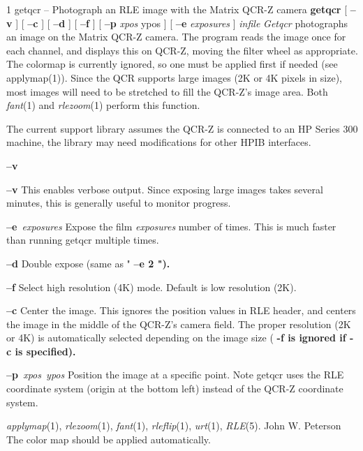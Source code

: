 %
%
%
 1
getqcr -- Photograph an RLE image with the Matrix QCR-Z camera
{\bf getqcr}
[
{\bf --v}
] [
{\bf --c}
] [
{\bf --d}
] [
{\bf --f}
] [
{\bf --p}
{\it xpos} ypos
] [
{\bf --e}
{\it exposures}
]
{\it infile}
{\it Getqcr}
photographs an image on the Matrix QCR-Z camera.  The program
reads the image once for each channel, and displays this on QCR-Z,
moving the filter wheel as appropriate.  The colormap is currently
ignored, so one must be applied first if needed (see applymap(1)).
Since the QCR supports large images (2K or 4K pixels in size), 
most images will need to be stretched to fill the QCR-Z's image area.
Both 
{\it fant}{\rm (1)}
and
{\it rlezoom}{\rm (1)}
perform this function.

The current support library assumes the QCR-Z is connected to an HP
Series 300 machine, the library may need modifications for other HPIB
interfaces.
\begin{TPlist}{{\bf --v}}
\item[{{\bf --v}}]
This enables verbose output.  Since exposing large images takes several
minutes, this is generally useful to monitor progress.
\item[{{\bf --e}{\it \ exposures}
}]
Expose the film 
{\it exposures}
number of times.  This is much faster than running getqcr multiple times.
\item[{{\bf --d}}]
Double expose (same as "%
\bf --e 2\rm%
").
\item[{{\bf --f}}]
Select high resolution (4K) mode.  Default is low resolution (2K).
\item[{{\bf --c}}]
Center the image.  This ignores the position values in RLE header,
and centers the image in the middle of the QCR-Z's camera field.
The proper resolution (2K or 4K) is automatically selected depending
on the image size (%
\bf -f \rm%
is ignored if %
\bf -c \rm%
is specified).
\item[{{\bf --p}{\it \ xpos\ ypos}
}]
Position the image at a specific point.  Note getqcr uses the RLE
coordinate system (origin at the bottom left) instead of the QCR-Z
coordinate system.
\end{TPlist}
\raggedright
{\it applymap}{\rm (1),}
{\it rlezoom}{\rm (1),}
{\it fant}{\rm (1),}
{\it rleflip}{\rm (1),}
{\it urt}{\rm (1),}
{\it RLE}{\rm (5).}
John W. Peterson
The color map should be applied automatically.


